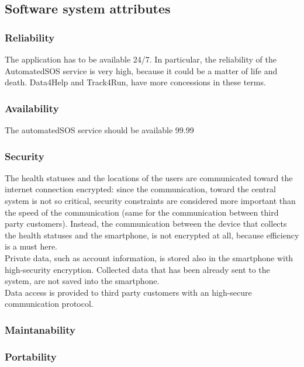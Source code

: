 \subsection{Software system attributes}
\subsubsection{Reliability}
The application has to be available 24/7. In particular, the reliability of the AutomatedSOS service is very high, because it could be a matter of life and death. Data4Help and Track4Run, have more concessions in these terms.

\subsubsection{Availability}
The automatedSOS service should be available 99.99%

\subsubsection{Security}
The health statuses and the locations of the users are communicated toward the internet connection encrypted: since the communication, toward the central system is not so critical, security constraints are considered more important than the speed of the communication (same for the communication between third party customers). Instead, the communication between the device that collects the health statuses and the smartphone, is not encrypted at all, because efficiency is a must here. \\ 
Private data, such as account information, is stored also in the smartphone with high-security encryption. Collected data that has been already sent to the system, are not saved into the smartphone. \\
Data access is provided to third party customers with an high-secure communication protocol.

\subsubsection{Maintanability}


\subsubsection{Portability}

